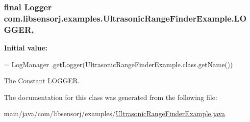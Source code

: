 \subsubsection[{L\+O\+G\+G\+E\+R}]{\setlength{\rightskip}{0pt plus 5cm}final Logger com.\+libsensorj.\+examples.\+Ultrasonic\+Range\+Finder\+Example.\+L\+O\+G\+G\+E\+R\hspace{0.3cm}{\ttfamily [static]}, {\ttfamily [private]}}\label{classcom_1_1libsensorj_1_1examples_1_1UltrasonicRangeFinderExample_ac1d433a89455addc211f404fe522f0ec}
{\bfseries Initial value\+:}
\begin{DoxyCode}
= LogManager
            .getLogger(UltrasonicRangeFinderExample.class.getName())
\end{DoxyCode}
The Constant L\+O\+G\+G\+E\+R. 

The documentation for this class was generated from the following file\+:\begin{DoxyCompactItemize}
\item 
main/java/com/libsensorj/examples/\hyperlink{UltrasonicRangeFinderExample_8java}{Ultrasonic\+Range\+Finder\+Example.\+java}\end{DoxyCompactItemize}
